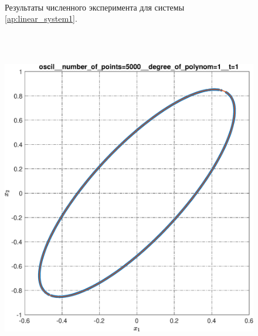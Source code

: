 \documentclass[../main.tex]{subfiles}
\begin{document}
\begin{figure}[ht!]
\begin{minipage}[b]{.3\linewidth}
  	\end{minipage} 
  	\caption{Результаты численного эксперимента для системы \eqref{ap:linear_system1}.}\label{fig:ap:rs_linear1}
  \end{figure}
  
  \begin{figure}[ht!] 
  	 \hspace{-2.5ex}
  	\begin{minipage}[b]{.3\linewidth} 
  		\small
  		\centering 
  		\includegraphics[width=\linewidth]{images/oscil__number_of_points=5000__degree_of_polynom=1__t=1.eps}
  		\label{fig:ap:oscilN5103k1T1} 
  	\end{minipage}
  	\hfill
  	\begin{minipage}[b]{.3\linewidth} 
  		\small
  		\centering

\end{minipage}
\end{figure}
\end{document}

